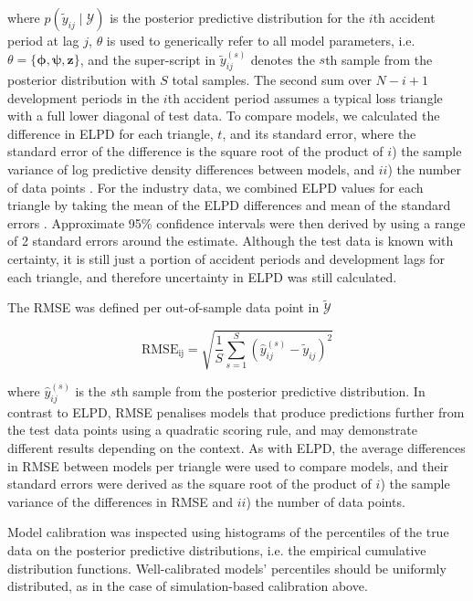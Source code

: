 where $p(\tilde{y}_{ij} \mid \mathcal{Y})$
is the posterior predictive distribution for
the $i$th accident period at lag $j$,
$\theta$ is used to generically refer to all
model parameters, i.e. $\theta = \{\bm{\phi}, \bm{\psi}, \bm{z}\}$,
and the super-script in $\tilde{y}_{ij}^{(s)}$ denotes the
$s$th sample from the posterior distribution with $S$
total samples.
The second sum over $N - i + 1$ development periods in the
$i$th accident period assumes a typical loss triangle
with a full lower diagonal of test data.
To compare models, we
calculated the difference in ELPD for each triangle, $t$,
and its standard error,
where the standard error of the difference is the
square root of the product of $i$) the sample variance of log predictive
density differences between models, and $ii$) 
the number of data points \citep{vehtari2017,sivula2020}.
For the industry data, we combined ELPD values for each
triangle by taking the mean of the ELPD differences and 
mean of the standard errors \citep{sivula2020}. 
Approximate 95\% confidence intervals were then derived
by using a range of 2 standard errors around the estimate.
Although the test data is known with certainty,
it is still just a portion of accident periods
and development lags
for each triangle, and therefore uncertainty
in ELPD was still calculated.

The RMSE was defined per out-of-sample data point in
$\tilde{\mathcal{Y}}$

\begin{equation}
	\label{eq:rmse}
	\mathrm{RMSE_{ij}} = \sqrt{\frac{1}{S} \sum_{s=1}^{S} (\hat{y}_{ij}^{(s)} - \tilde{y}_{ij})^2}
\end{equation}

where $\hat{y}_{ij}^{(s)}$ is the $s$th sample from the 
posterior predictive distribution.
In contrast to ELPD, RMSE penalises models that produce
predictions further from the test data points using a
quadratic scoring rule,
and may demonstrate different results depending
on the context.
As with ELPD, the average differences in RMSE
between models per triangle were used to compare models, and 
their standard errors were derived as the square root
of the product of $i$) the sample variance of the differences
in RMSE and $ii$) the number of data points.

Model calibration was inspected using histograms
of the percentiles of the true data on the 
posterior predictive distributions, i.e.
the empirical cumulative distribution functions. 
Well-calibrated models' percentiles should be
uniformly distributed, as in the case
of simulation-based calibration above.

